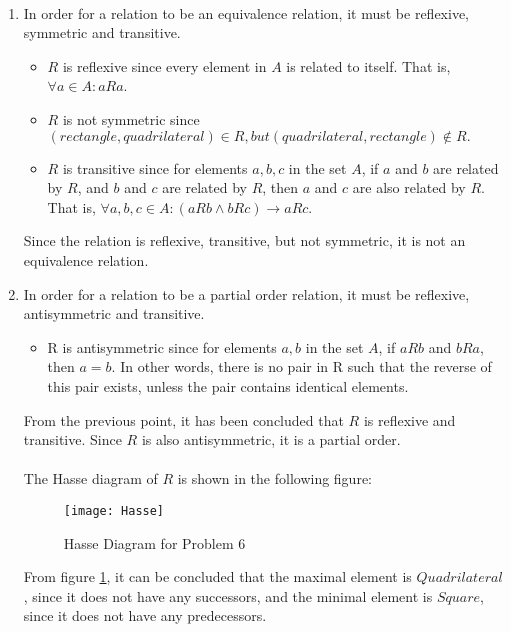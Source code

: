 \\ \begin{enumerate}
    \item In order for a relation to be an equivalence relation, it must be reflexive, symmetric and transitive.
    \begin{itemize}
        \item $R$ is reflexive since every element in $A$ is related to itself. That is, $\forall a \in A: aRa$. 
        \item $R$ is not symmetric since $(rectangle, quadrilateral) \in R, but (quadrilateral, rectangle) \notin R.$
        \item $R$ is transitive since for elements $a, b, c$ in the set $A$, if $a$ and $b$ are related by $R$, and $b$ and $c$ are related by $R$, then $a$ and $c$ are also related by $R$. That is, $\forall a,b,c \in A: (aRb \wedge bRc) \rightarrow aRc$.
    \end{itemize}
    Since the relation is reflexive, transitive, but not symmetric, it is not an equivalence relation.
    
    \item In order for a relation to be a partial order relation, it must be reflexive, antisymmetric and transitive.
    \begin{itemize}
        \item R is antisymmetric since for elements $a, b$ in the set $A$, if $aRb$ and $bRa$, then $a=b$. In other words, there is no pair in R such that the reverse of this pair exists, unless the pair contains identical elements.
    \end{itemize}
    From the previous point, it has been concluded that $R$ is reflexive and transitive. Since $R$ is also antisymmetric, it is a partial order.
    \\
    \\
    The Hasse diagram of $R$ is shown in the following figure:
    \newpage
    \begin{figure}[h]
        \centering
        \texttt{[image: Hasse]}
        \caption{Hasse Diagram for Problem 6}
        \label{fig:Hasse}
    \end{figure}
    From figure \ref{fig:Hasse}, it can be concluded that the maximal element is $Quadrilateral$, since it does not have any successors, and the minimal element is $Square$, since it does not have any predecessors.
    
\end{enumerate}